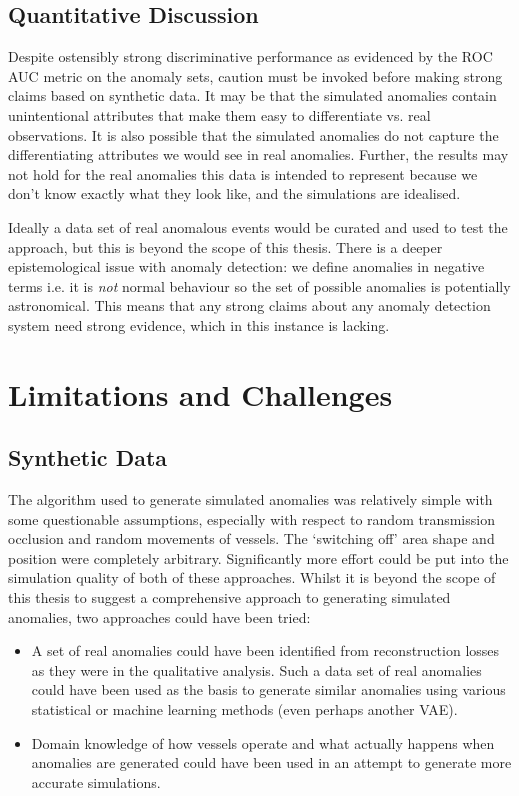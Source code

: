 \documentclass{mldsmsc}
\begin{document}
\subsection{Quantitative Discussion}

Despite ostensibly strong discriminative performance as evidenced by the ROC AUC metric on the anomaly sets, caution must be invoked before making strong claims based on synthetic data. It may be that the simulated anomalies contain unintentional attributes that make them easy to differentiate vs. real observations. It is also possible that the simulated anomalies do not capture the differentiating attributes we would see in real anomalies. Further, the results may not hold for the real anomalies this data is intended to represent because we don't know exactly what they look like, and the simulations are idealised. 

Ideally a data set of real anomalous events would be curated and used to test the approach, but this is beyond the scope of this thesis.  There is a deeper epistemological issue with anomaly detection: we define anomalies in negative terms i.e. it is \textit{not} normal behaviour so the set of possible anomalies is potentially astronomical. This means that any strong claims about any anomaly detection system need strong evidence, which in this instance is lacking.

\section{Limitations and Challenges}
\subsection{Synthetic Data} \label{sec:synthetic_critique}

The algorithm used to generate simulated anomalies was relatively simple with some questionable assumptions, especially with respect to random transmission occlusion and random movements of vessels. The `switching off' area shape and position were completely arbitrary. Significantly more effort could be put into the simulation quality of both of these approaches. Whilst it is beyond the scope of this thesis to suggest a comprehensive approach to generating simulated anomalies, two approaches could have been tried:
\begin{itemize}
	\item A set of real anomalies could have been identified from reconstruction losses as they were in the qualitative analysis. Such a data set of real anomalies could have been used as the basis to generate similar anomalies using various statistical or machine learning methods (even perhaps another VAE).
	\item Domain knowledge of how vessels operate and what actually happens when anomalies are generated could have been used in an attempt to generate more accurate simulations.
\end{itemize}
\end{document}
